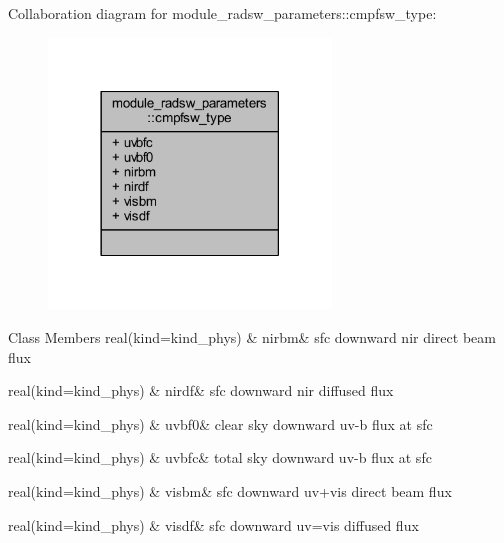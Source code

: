 Collaboration diagram for module\+\_\+radsw\+\_\+parameters\+:\+:cmpfsw\+\_\+type\+:\nopagebreak
\begin{figure}[H]
\begin{center}
\leavevmode
\includegraphics[width=213pt]{structmodule__radsw__parameters_1_1cmpfsw__type__coll__graph}
\end{center}
\end{figure}
\begin{DoxyFields}{Class Members}
real(kind=kind\+\_\+phys)\hypertarget{namespacemodule__radsw__parameters_aae8070f9f477bf036071ccc7d707693d}{}\label{namespacemodule__radsw__parameters_aae8070f9f477bf036071ccc7d707693d}
&
nirbm&
sfc downward nir direct beam flux \\
\hline

real(kind=kind\+\_\+phys)\hypertarget{namespacemodule__radsw__parameters_a9944f87ce40eb678e3ca1d88b1dbb797}{}\label{namespacemodule__radsw__parameters_a9944f87ce40eb678e3ca1d88b1dbb797}
&
nirdf&
sfc downward nir diffused flux \\
\hline

real(kind=kind\+\_\+phys)\hypertarget{namespacemodule__radsw__parameters_a9e9e74c17ad3aa0a1c280f1eae513b22}{}\label{namespacemodule__radsw__parameters_a9e9e74c17ad3aa0a1c280f1eae513b22}
&
uvbf0&
clear sky downward uv-\/b flux at sfc \\
\hline

real(kind=kind\+\_\+phys)\hypertarget{namespacemodule__radsw__parameters_a7b0ac40e0ceb2ce82b6b95a614542b4f}{}\label{namespacemodule__radsw__parameters_a7b0ac40e0ceb2ce82b6b95a614542b4f}
&
uvbfc&
total sky downward uv-\/b flux at sfc \\
\hline

real(kind=kind\+\_\+phys)\hypertarget{namespacemodule__radsw__parameters_aabfae10580f53c63900c74261b1b219c}{}\label{namespacemodule__radsw__parameters_aabfae10580f53c63900c74261b1b219c}
&
visbm&
sfc downward uv+vis direct beam flux \\
\hline

real(kind=kind\+\_\+phys)\hypertarget{namespacemodule__radsw__parameters_a3eb91eab30abc0f1f1bb05c5447cede5}{}\label{namespacemodule__radsw__parameters_a3eb91eab30abc0f1f1bb05c5447cede5}
&
visdf&
sfc downward uv=vis diffused flux \\
\hline

\end{DoxyFields}

